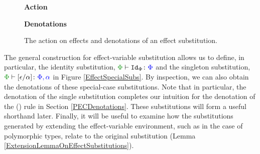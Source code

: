 \begin{figure}[H]
    \centering
    \begin{minipage}{0.47\linewidth}
      \begin{framed}
        \centering
        \textbf{Action}
  
      \end{framed}
    \end{minipage}
    \quad
    \begin{minipage}{0.47\linewidth}
      \begin{framed}
        \centering
        \textbf{Denotations}
  
      \end{framed}
    \end{minipage}
    \caption{The action on effects and denotations of an effect substitution.}
    \label{EffectSubstitutionActionEffects}
\end{figure}

The general construction for effect-variable substitution allows us to define, in particular, the identity substitution, $\typerelation{\P}{\Id{\P}}{\P}$ and the singleton substitution, $\typerelation{\P}{\ssub{\a}{\e}}{\P,\a}$ in Figure \ref{EffectSpecialSubs}. By inspection, we can also obtain the denotations of these special-case substitutions. Note that in particular, the denotation of the single substitution completes our intuition for the denotation of the (\textit{\vspec}) rule in Section \ref{PECDenotations}. These substitutions will form a useful shorthand later. Finally, it will be useful to examine how the substitutions generated by extending the effect-variable environment, such as in the case of polymorphic types, relate to the original substitution (Lemma \ref{ExtensionLemmaOnEffectSubstitutions}).

